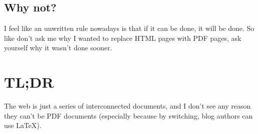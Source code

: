 \documentclass[12pt]{article}
\begin{document}

  \subsection{Why not?}

  I feel like an unwritten rule nowadays is that if it can be done, it will be done. So like don't ask me why I wanted to replace HTML pages with PDF pages, ask yourself why it wasn't done sooner. 

  \section{TL;DR}

  The web is just a series of interconnected documents, and I don't see any reason they can't be PDF documents (especially because by switching, blog authors can use LaTeX). 
\end{document}
